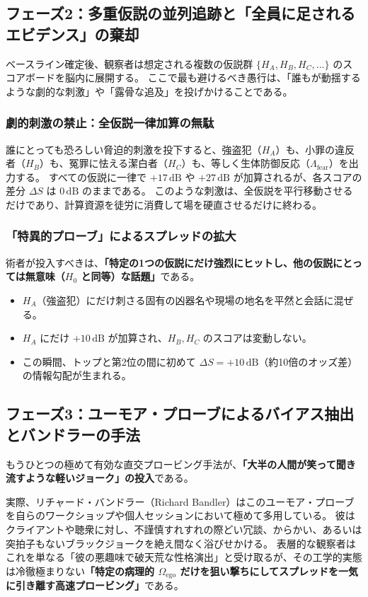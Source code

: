 \subsection{フェーズ2：多重仮説の並列追跡と「全員に足されるエビデンス」の棄却}

ベースライン確定後、観察者は想定される複数の仮説群 $\{H_A, H_B, H_C, \dots\}$ のスコアボードを脳内に展開する。
ここで最も避けるべき愚行は、「誰もが動揺するような劇的な刺激」や「露骨な追及」を投げかけることである。

\subsubsection{劇的刺激の禁止：全仮説一律加算の無駄}
誰にとっても恐ろしい脅迫的刺激を投下すると、強盗犯（$H_A$）も、小罪の違反者（$H_B$）も、冤罪に怯える潔白者（$H_C$）も、等しく生体防御反応（$\Lambda_{\mathrm{fear}}$）を出力する。
すべての仮説に一律で $+17\,\mathrm{dB}$ や $+27\,\mathrm{dB}$ が加算されるが、各スコアの差分 $\Delta S$ は $0\,\mathrm{dB}$ のままである。
このような刺激は、全仮説を平行移動させるだけであり、計算資源を徒労に消費して場を硬直させるだけに終わる。

\subsubsection{「特異的プローブ」によるスプレッドの拡大}
術者が投入すべきは、\textbf{「特定の1つの仮説にだけ強烈にヒットし、他の仮説にとっては無意味（$H_0$ と同等）な話題」}である。
\begin{itemize}
\item $H_A$（強盗犯）にだけ刺さる固有の凶器名や現場の地名を平然と会話に混ぜる。
\item $H_A$ にだけ $+10\,\mathrm{dB}$ が加算され、$H_B, H_C$ のスコアは変動しない。
\item この瞬間、トップと第2位の間に初めて $\Delta S = +10\,\mathrm{dB}$（約10倍のオッズ差）の情報勾配が生まれる。
\end{itemize}

\subsection{フェーズ3：ユーモア・プローブによるバイアス抽出とバンドラーの手法}

もうひとつの極めて有効な直交プロービング手法が、\textbf{「大半の人間が笑って聞き流すような軽いジョーク」の投入}である。

実際、リチャード・バンドラー（Richard Bandler）はこのユーモア・プローブを自らのワークショップや個人セッションにおいて極めて多用している。
彼はクライアントや聴衆に対し、不謹慎すれすれの際どい冗談、からかい、あるいは突拍子もないブラックジョークを絶え間なく浴びせかける。
表層的な観察者はこれを単なる「彼の悪趣味で破天荒な性格演出」と受け取るが、その工学的実態は冷徹極まりない\textbf{「特定の病理的 $\Omega_{\mathrm{ego}}$ だけを狙い撃ちにしてスプレッドを一気に引き離す高速プロービング」}である。

